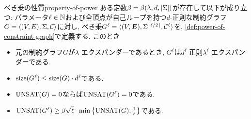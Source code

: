 \begin{lemma}{べき乗の性質}{property-of-power}
  ある定数$\beta=\beta(\lambda,d,\abs{\Sigma})$が存在して以下が成り立つ:
  パラメータ$\ell\in\mathbb{N}$および全頂点が自己ループを持つ$d$-正則な制約グラフ$G=\langle(V,E),\Sigma,\mathcal{C}\rangle$に対し, べき乗$G^\ell = \langle(V,\boldsymbol{E}),\Sigma^{\lceil\ell/2\rceil},\mathcal{C}^\ell\rangle$を, \cref{def:power-of-constraint-graph}で定義する.
  このとき
  \begin{itemize}
    \item 元の制約グラフ$G$が$\lambda$-エクスパンダーであるとき, $G^\ell$は$d^\ell$-正則$\lambda^\ell$-エクスパンダーである.
    \item $\mathrm{size}(G^\ell) \le \mathrm{size}(G)\cdot d^\ell$である.
    \item $\mathrm{UNSAT}(G)=0$ならば$\mathrm{UNSAT}(G^\ell)=0$である.
    \item $\mathrm{UNSAT}(G^\ell) \ge \beta\sqrt{\ell}\cdot \min\qty{ \mathrm{UNSAT}(G), \frac{1}{\ell} }$である.
  \end{itemize}
\end{lemma}
